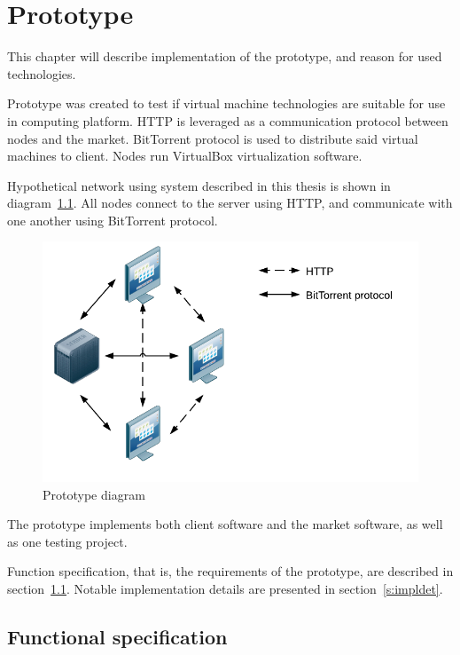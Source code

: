 \chapter{Prototype}
\label{ch:prototype}

This chapter will describe implementation of the prototype, and reason for used technologies.

Prototype was created to test if virtual machine technologies are suitable for use in computing platform. HTTP is leveraged as a communication protocol between nodes and the market. BitTorrent protocol is used to distribute said virtual machines to client. Nodes run VirtualBox virtualization software.

Hypothetical network using system described in this thesis is shown in diagram~\ref{f:protomain}. All nodes connect to the server using HTTP, and communicate with one another using BitTorrent protocol.

\begin{figure}
\centering
\includegraphics{diagrams/PrototypeMain.pdf}
\caption{Prototype diagram}
\label{f:protomain}
\end{figure}

The prototype implements both client software and the market software, as well as one testing project.

Function specification, that is, the requirements of the prototype, are described in section~\ref{s:funcspec}. Notable implementation details are presented in section~\ref{s:impldet}.

\section{Functional specification}
\label{s:funcspec}

